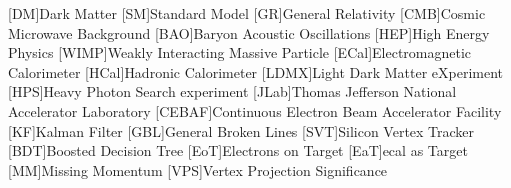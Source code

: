 
\usepackage{epsfig} %
\usepackage{epic} %
\usepackage{eepic} %
\usepackage{url} %
\usepackage{longtable} %
\usepackage{mathrsfs} %
\usepackage{multirow} %
\usepackage{bigstrut} %
\usepackage{amssymb} %
\usepackage{graphicx} %
\usepackage{setspace} %
\usepackage{xspace} %
\usepackage{amsmath} %
\usepackage{siunitx} %
\usepackage{booktabs} %
\usepackage{hyperref} %
\usepackage{subcaption}
\usepackage{graphicx} %

\usepackage[noabbrev,capitalise]{cleveref} %

\newcommand{\creflastconjunction}{, and } %

\usepackage[compat=1.1.0]{tikz-feynman} %

\usepackage{hepunits}

\newcommand{\fourgev}{\qty{4}{GeV}\xspace}
\newcommand{\eightgev}{\qty{8}{GeV}\xspace}
\newcommand{\ecal}{ECal}
\newcommand{\hcal}{HCal}

\usepackage{acronym}
[DM]{Dark Matter}
[SM]{Standard Model}
[GR]{General Relativity}
[CMB]{Cosmic Microwave Background}
[BAO]{Baryon Acoustic Oscillations}
[HEP]{High Energy Physics}
[WIMP]{Weakly Interacting Massive Particle}
[ECal]{Electromagnetic Calorimeter}
[HCal]{Hadronic Calorimeter}
[LDMX]{Light Dark Matter eXperiment}
[HPS]{Heavy Photon Search experiment}
[JLab]{Thomas Jefferson National Accelerator Laboratory}
[CEBAF]{Continuous Electron Beam Accelerator Facility}
[KF]{Kalman Filter}
[GBL]{General Broken Lines}
[SVT]{Silicon Vertex Tracker}
[BDT]{Boosted Decision Tree}
[EoT]{Electrons on Target}
[EaT]{\ac{ecal} as Target}
[MM]{Missing Momentum}
[VPS]{Vertex Projection Significance}


